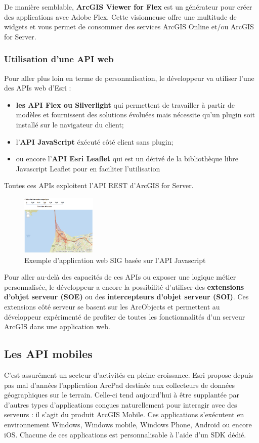 \documentclass[11pt]{article}
\begin{document}
De manière semblable, \textbf{ArcGIS Viewer for Flex} est un générateur pour créer des applications avec Adobe Flex. Cette visionneuse offre une multitude de widgets et vous permet de consommer des services ArcGIS Online et/ou ArcGIS for Server.


\subsubsection{Utilisation d'une API web}
Pour aller plus loin en terme de personnalisation, le développeur va utiliser l'une des APIs web d'Esri : 
\begin{itemize}
	\item \textbf{les API Flex ou Silverlight} qui permettent de travailler à partir de modèles et fournissent des solutions évoluées mais nécessite qu'un plugin soit installé sur le navigateur du client;
	\item l'\textbf{API JavaScript} éxécuté côté client sans plugin;
	\item ou encore l'\textbf{API Esri Leaflet} qui est un dérivé de la bibliothèque libre Javascript Leaflet pour en faciliter l'utilisation
\end{itemize}

Toutes ces APIs exploitent l'API REST d'ArcGIS for Server.

\begin{figure}[!h]
	\center \includegraphics[width=0.32\textwidth]{img/cours/api_javascript.png}
	\caption{Exemple d'application web SIG basée sur l'API Javascript}
\end{figure}

Pour aller au-delà des capacités de ces APIs ou exposer une logique métier personnalisée, le développeur a encore la possibilité d'utiliser des \textbf{extensions d'objet serveur (SOE)} ou des \textbf{intercepteurs d'objet serveur (SOI)}. Ces extensions côté serveur se basent sur les ArcObjects et permettent au développeur expérimenté de profiter de toutes les fonctionnalités d'un serveur ArcGIS dans une application web.


\subsection{Les API mobiles}
C’est assurément un secteur d’activités en pleine croissance. Esri propose depuis pas mal d’années l’application ArcPad destinée aux collecteurs de données géographiques sur le terrain. Celle-ci tend aujourd’hui à être supplantée par d’autres types d’applications conçues naturellement pour interagir avec des serveurs : il s’agit du produit ArcGIS Mobile. Ces applications s’exécutent en environnement Windows, Windows mobile, Windows Phone, Androïd ou encore iOS. Chacune de ces applications est personnalisable à l’aide d’un SDK dédié.
\end{document}
